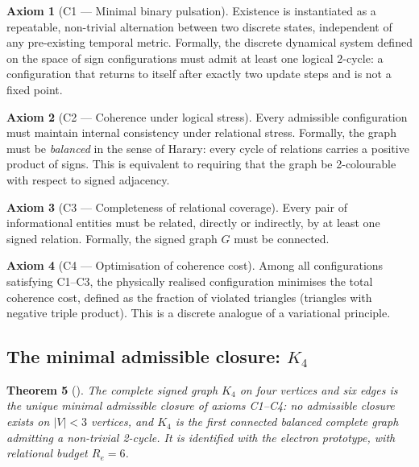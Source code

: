\documentclass[11pt,a4paper]{article}
\theoremstyle{plain}
\newtheorem{theorem}{Theorem}[section]
\theoremstyle{definition}
\newtheorem{axiom}[theorem]{Axiom}
\theoremstyle{remark}
\begin{document}
\begin{axiom}[C1 --- Minimal binary pulsation]
Existence is instantiated as a repeatable, non-trivial alternation between two discrete states, independent of any pre-existing temporal metric. Formally, the discrete dynamical system defined on the space of sign configurations must admit at least one logical $2$-cycle: a configuration that returns to itself after exactly two update steps and is not a fixed point.
\end{axiom}

\begin{axiom}[C2 --- Coherence under logical stress]
Every admissible configuration must maintain internal consistency under relational stress. Formally, the graph must be \emph{balanced} in the sense of Harary: every cycle of relations carries a positive product of signs. This is equivalent to requiring that the graph be 2-colourable with respect to signed adjacency.
\end{axiom}

\begin{axiom}[C3 --- Completeness of relational coverage]
Every pair of informational entities must be related, directly or indirectly, by at least one signed relation. Formally, the signed graph $G$ must be connected.
\end{axiom}

\begin{axiom}[C4 --- Optimisation of coherence cost]
Among all configurations satisfying C1--C3, the physically realised configuration minimises the total coherence cost, defined as the fraction of violated triangles (triangles with negative triple product). This is a discrete analogue of a variational principle.
\end{axiom}

\subsection{The minimal admissible closure: \texorpdfstring{$K_4$}{K4}}
\label{subsec:K4}
\begin{theorem}[\cite{D16a}]
\label{thm:K4}
The complete signed graph $K_4$ on four vertices and six edges is the unique minimal admissible closure of axioms C1--C4: no admissible closure exists on $|V|<3$ vertices, and $K_4$ is the first connected balanced complete graph admitting a non-trivial 2-cycle. It is identified with the electron prototype, with relational budget $R_e=6$.
\end{theorem}
\end{document}
